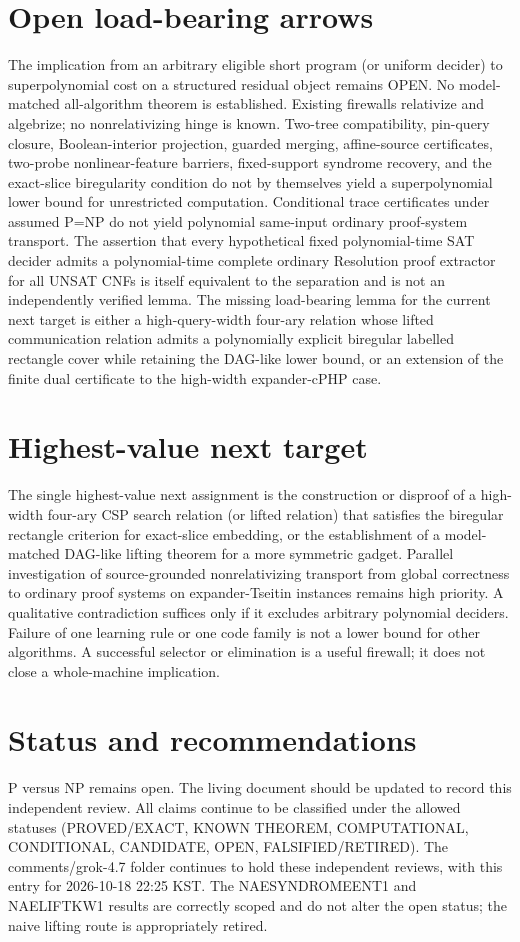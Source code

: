 \documentclass[11pt]{article}
\begin{document}
\section{Open load-bearing arrows}
The implication from an arbitrary eligible short program (or uniform decider) to superpolynomial cost on a structured residual object remains OPEN. No model-matched all-algorithm theorem is established. Existing firewalls relativize and algebrize; no nonrelativizing hinge is known. Two-tree compatibility, pin-query closure, Boolean-interior projection, guarded merging, affine-source certificates, two-probe nonlinear-feature barriers, fixed-support syndrome recovery, and the exact-slice biregularity condition do not by themselves yield a superpolynomial lower bound for unrestricted computation. Conditional trace certificates under assumed P=NP do not yield polynomial same-input ordinary proof-system transport. The assertion that every hypothetical fixed polynomial-time SAT decider admits a polynomial-time complete ordinary Resolution proof extractor for all UNSAT CNFs is itself equivalent to the separation and is not an independently verified lemma. The missing load-bearing lemma for the current next target is either a high-query-width four-ary relation whose lifted communication relation admits a polynomially explicit biregular labelled rectangle cover while retaining the DAG-like lower bound, or an extension of the finite dual certificate to the high-width expander-cPHP case.

\section{Highest-value next target}
The single highest-value next assignment is the construction or disproof of a high-width four-ary CSP search relation (or lifted relation) that satisfies the biregular rectangle criterion for exact-slice embedding, or the establishment of a model-matched DAG-like lifting theorem for a more symmetric gadget. Parallel investigation of source-grounded nonrelativizing transport from global correctness to ordinary proof systems on expander-Tseitin instances remains high priority. A qualitative contradiction suffices only if it excludes arbitrary polynomial deciders. Failure of one learning rule or one code family is not a lower bound for other algorithms. A successful selector or elimination is a useful firewall; it does not close a whole-machine implication.

\section{Status and recommendations}
P versus NP remains open. The living document should be updated to record this independent review. All claims continue to be classified under the allowed statuses (PROVED/EXACT, KNOWN THEOREM, COMPUTATIONAL, CONDITIONAL, CANDIDATE, OPEN, FALSIFIED/RETIRED). The comments/grok-4.7 folder continues to hold these independent reviews, with this entry for 2026-10-18 22:25 KST. The NAESYNDROMEENT1 and NAELIFTKW1 results are correctly scoped and do not alter the open status; the naive lifting route is appropriately retired.

\end{document}

